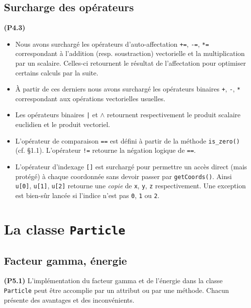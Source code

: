 \documentclass[12pt, letterpaper, twoside]{article}
\newcommand{\T}[1]{\texttt{#1}}
\begin{document}
\subsection{Surcharge des opérateurs}
\noindent \textbf{(P4.3)}
\begin{itemize}
\item Nous avons surchargé les opérateurs d'auto-affectation \T{+=}, \T{-=}, \T{*=} correspondant à l'addition (resp. soustraction) vectorielle et la multiplication par un scalaire. Celles-ci retournent le résultat de l'affectation pour optimiser certains calculs par la suite.

\item À partir de ces derniers nous avons surchargé les opérateurs binaires \T{+}, \T{-}, \T{*} correspondant aux opérations vectorielles usuelles.

\item Les opérateurs binaires \T{|} et \T{$\wedge$} retournent respectivement le produit scalaire euclidien et le produit vectoriel.

\item L'opérateur de comparaison \T{==} est défini à partir de la méthode \T{is\_zero()} (cf. \S1.1). L'opérateur \T{!=} retourne la négation logique de \T{==}.

\item L'opérateur d'indexage \T{[]} est surchargé pour permettre un accès direct (mais protégé) à chaque coordonnée sans devoir passer par \T{getCoords()}. Ainsi \T{u[0]}, \T{u[1]}, \T{u[2]} retourne une \textit{copie} de \T{x}, \T{y}, \T{z} respectivement. Une exception est bien-sûr lancée si l'indice n'est pas \T{0}, \T{1} ou \T{2}.
\end{itemize}

\section{La classe \T{Particle}}

\subsection{Facteur gamma, énergie}
\noindent \textbf{(P5.1)}
L'implémentation du facteur gamma et de l'énergie dans la classe \T{Particle} peut être accomplie par un attribut ou par une méthode. Chacun présente des avantages et des inconvénients.
\end{document}
